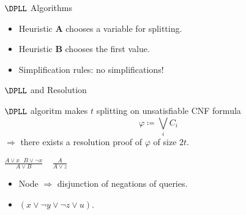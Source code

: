 \begin{frame}{$\DPLL$ Algorithms}

    \begin{center}
                
    \end{center}

    
	\pause
    \pause
    \pause
    \pause
    \pause
    \begin{itemize}
        \item Heuristic $\mathbf{A}$ chooses a variable for splitting.
    	\pause
	    \item Heuristic $\mathbf{B}$ chooses the first value.
    	\pause
    	\item Simplification rules: \alert{no simplifications!}
    \end{itemize}
\end{frame}

\begin{frame}{$\DPLL$ and Resolution}
    
    \begin{theorem}
        $\DPLL$ algoritm makes $t$ splitting on \alert{unsatisfiable} CNF formula
        $$\varphi \coloneqq \bigvee\limits_i C_i$$
        $\Rightarrow$ there exists a resolution proof of $\varphi$ of size $2t$.
    \end{theorem}

    \pause

    \begin{minipage}{0.58\linewidth}
        \centering
        
    \end{minipage}
    \pause
    \begin{minipage}{0.4\linewidth}
        \centering
        $\frac{A \lor x ~~~ B \lor \neg x}{A \lor B} ~~~~~ \frac{A}{A \lor z}$
        \begin{itemize}
            \item Node $\Rightarrow$ disjunction of negations of queries.
            \item $(x \lor \neg y \lor \neg z \lor u)$.
        \end{itemize}
    \end{minipage}

\end{frame}

